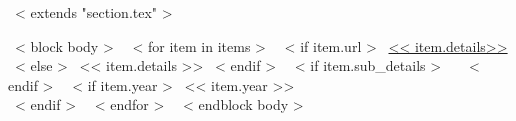 ~< extends "section.tex" >~

~< block body >~
  ~< for item in items >~
    ~< if item.url >~
      \href{<< item.url >>}{<< item.details>>}
    ~< else >~
      << item.details >>
    ~< endif >~
    ~< if item.sub_details >~
      \,\, {\scriptsize
        \color{gray}{<< item.sub_details >>}
      } %
    ~< endif >~
    ~< if item.year >~
        \hfill << item.year >> \\
    ~< endif >~
  ~< endfor >~
~< endblock body >~
